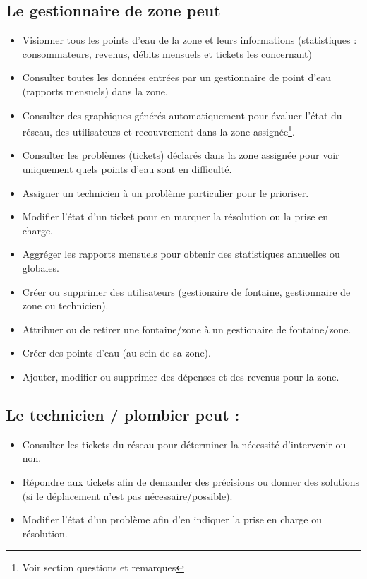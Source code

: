 \documentclass[a4paper, 11pt]{article}
\begin{document}
\subsection{Le gestionnaire de zone peut}
\begin{itemize}
  \item Visionner tous les points d'eau de la zone et leurs informations (statistiques : consommateurs, revenus, débits mensuels et tickets les concernant)
  \item Consulter toutes les données entrées par un gestionnaire de point d'eau (rapports mensuels) dans la zone.
  \item Consulter des graphiques générés automatiquement pour évaluer l'état du réseau, des utilisateurs et recouvrement dans la zone assignée\footnote{Voir section questions et remarques}.
  \item Consulter les problèmes (tickets) déclarés dans la zone assignée pour voir uniquement quels points d'eau sont en difficulté.
  \item Assigner un technicien à un problème particulier pour le prioriser.
  \item Modifier l'état d'un ticket pour en marquer la résolution ou la prise en charge.
  \item Aggréger les rapports mensuels pour obtenir des statistiques annuelles ou globales. %
  \item Créer ou supprimer des utilisateurs (gestionaire de fontaine, gestionnaire de zone ou technicien). %
  \item Attribuer ou de retirer une fontaine/zone à un gestionaire de fontaine/zone.
  \item Créer des points d'eau (au sein de sa zone).
  \item Ajouter, modifier ou supprimer des dépenses et des revenus pour la zone.
\end{itemize}

\subsection{Le technicien / plombier peut :}
\begin{itemize}
  \item Consulter les tickets du réseau pour déterminer la nécessité d'intervenir ou non.
  \item Répondre aux tickets afin de demander des précisions ou donner des solutions (si le déplacement n'est pas nécessaire/possible).
  \item Modifier l'état d'un problème afin d'en indiquer la prise en charge ou résolution.
\end{itemize}
\end{document}

